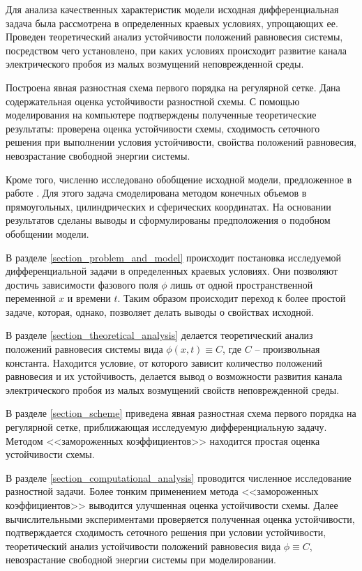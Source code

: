 \documentclass[a4paper,12pt]{article}
\theoremstyle{plain}
\theoremstyle{definition}
\begin{document}
Для анализа качественных характеристик модели исходная дифференциальная задача была рассмотрена в определенных краевых условиях, упрощающих ее. Проведен теоретический анализ устойчивости положений равновесия системы, посредством чего установлено, при каких условиях происходит развитие канала электрического пробоя из малых возмущений неповрежденной среды.

Построена явная разностная схема первого порядка на регулярной сетке. Дана содержательная оценка устойчивости разностной схемы. С помощью моделирования на компьютере подтверждены полученные теоретические результаты: проверена оценка устойчивости схемы, сходимость сеточного решения при выполнении условия устойчивости, свойства положений равновесия, невозрастание свободной энергии системы.

Кроме того, численно исследовано обобщение исходной модели, предложенное в работе \cite{zipunova_higher_codimension}. Для этого задача смоделирована методом конечных объемов в прямоугольных, цилиндрических и сферических координатах. На основании результатов сделаны выводы и сформулированы предположения о подобном обобщении модели.

В разделе \ref{section_problem_and_model} происходит постановка исследуемой дифференциальной задачи в определенных краевых условиях. Они позволяют достичь зависимости фазового поля $\phi$ лишь от одной пространственной переменной $x$ и времени $t$. Таким образом происходит переход к более простой задаче, которая, однако, позволяет делать выводы о свойствах исходной.

В разделе \ref{section_theoretical_analysis} делается теоретический анализ положений равновесия системы вида $\phi(x, t) \equiv C$, где $C$ -- произвольная константа. Находится условие, от которого зависит количество положений равновесия и их устойчивость, делается вывод о возможности развития канала электрического пробоя из малых возмущений свойств неповрежденной среды.

В разделе \ref{section_scheme} приведена явная разностная схема первого порядка на регулярной сетке, приближающая исследуемую дифференциальную задачу. Методом <<замороженных коэффициентов>> находится простая оценка устойчивости схемы.

В разделе \ref{section_computational_analysis} проводится численное исследование разностной задачи. Более тонким применением метода <<замороженных коэффициентов>> выводится улучшенная \linebreak оценка устойчивости схемы. Далее вычислительными экспериментами проверяется полученная оценка устойчивости, подтверждается сходимость сеточного решения при условии устойчивости, теоретический анализ устойчивости положений равновесия вида $\phi \equiv C$, невозрастание свободной энергии системы при моделировании.
\end{document}
